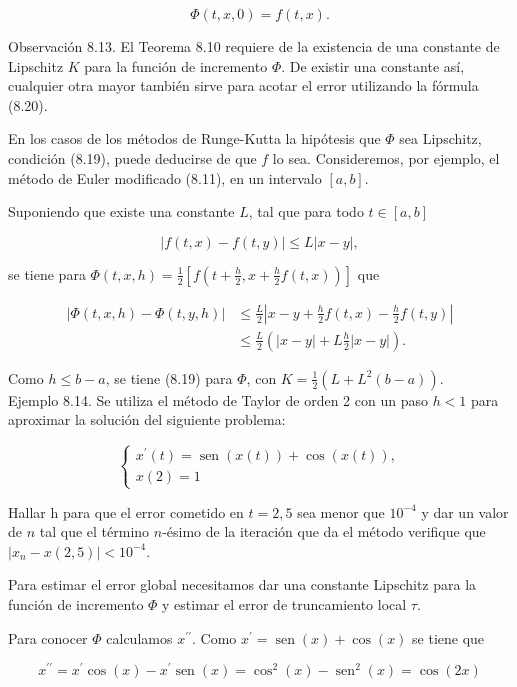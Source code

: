 \documentclass[10pt]{book}
\begin{document}
$$
\Phi(t, x, 0)=f(t, x) .
$$

Observación 8.13. El Teorema 8.10 requiere de la existencia de una constante de Lipschitz $K$ para la función de incremento $\Phi$. De existir una constante así, cualquier otra mayor también sirve para acotar el error utilizando la fórmula (8.20).

En los casos de los métodos de Runge-Kutta la hipótesis que $\Phi$ sea Lipschitz, condición (8.19), puede deducirse de que $f$ lo sea. Consideremos, por ejemplo, el método de Euler modificado (8.11), en un intervalo $[a, b]$.

Suponiendo que existe una constante $L$, tal que para todo $t \in[a, b]$

$$
|f(t, x)-f(t, y)| \leq L|x-y|,
$$

se tiene para $\Phi(t, x, h)=\frac{1}{2}\left[f\left(t+\frac{h}{2}, x+\frac{h}{2} f(t, x)\right)\right]$ que

$$
\begin{aligned}
|\Phi(t, x, h)-\Phi(t, y, h)| & \leq \frac{L}{2}\left|x-y+\frac{h}{2} f(t, x)-\frac{h}{2} f(t, y)\right| \\
& \leq \frac{L}{2}\left(|x-y|+L \frac{h}{2}|x-y|\right) .
\end{aligned}
$$

Como $h \leq b-a$, se tiene (8.19) para $\Phi$, con $K=\frac{1}{2}\left(L+L^{2}(b-a)\right)$.\\
Ejemplo 8.14. Se utiliza el método de Taylor de orden 2 con un paso $h<1$ para aproximar la solución del siguiente problema:

$$
\left\{\begin{array}{l}
x^{\prime}(t)=\operatorname{sen}(x(t))+\cos (x(t)), \\
x(2)=1
\end{array}\right.
$$

Hallar h para que el error cometido en $t=2,5$ sea menor que $10^{-4}$ y dar un valor de $n$ tal que el término $n$-ésimo de la iteración que da el método verifique que $\left|x_{n}-x(2,5)\right|<10^{-4}$.

Para estimar el error global necesitamos dar una constante Lipschitz para la función de incremento $\Phi$ y estimar el error de truncamiento local $\tau$.

Para conocer $\Phi$ calculamos $x^{\prime \prime}$. Como $x^{\prime}=\operatorname{sen}(x)+\cos (x)$ se tiene que

$$
x^{\prime \prime}=x^{\prime} \cos (x)-x^{\prime} \operatorname{sen}(x)=\cos ^{2}(x)-\operatorname{sen}^{2}(x)=\cos (2 x)
$$
\end{document}
